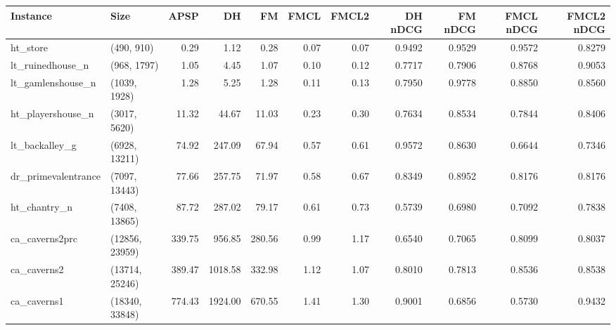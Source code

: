 \begin{tabular}{llrrrrrrrrr}
\toprule
           Instance &           Size &   APSP &      DH &     FM &  FMCL &  FMCL2 &  DH nDCG &  FM nDCG &  FMCL nDCG &  FMCL2 nDCG \\
\midrule
           ht\_store &     (490, 910) &   0.29 &    1.12 &   0.28 &  0.07 &   0.07 &   0.9492 &   0.9529 &     0.9572 &      0.8279 \\
   lt\_ruinedhouse\_n &    (968, 1797) &   1.05 &    4.45 &   1.07 &  0.10 &   0.12 &   0.7717 &   0.7906 &     0.8768 &      0.9053 \\
  lt\_gamlenshouse\_n &   (1039, 1928) &   1.28 &    5.25 &   1.28 &  0.11 &   0.13 &   0.7950 &   0.9778 &     0.8850 &      0.8560 \\
  ht\_playershouse\_n &   (3017, 5620) &  11.32 &   44.67 &  11.03 &  0.23 &   0.30 &   0.7634 &   0.8534 &     0.7844 &      0.8406 \\
     lt\_backalley\_g &  (6928, 13211) &  74.92 &  247.09 &  67.94 &  0.57 &   0.61 &   0.9572 &   0.8630 &     0.6644 &      0.7346 \\
dr\_primevalentrance &  (7097, 13443) &  77.66 &  257.75 &  71.97 &  0.58 &   0.67 &   0.8349 &   0.8952 &     0.8176 &      0.8176 \\
       ht\_chantry\_n &  (7408, 13865) &  87.72 &  287.02 &  79.17 &  0.61 &   0.73 &   0.5739 &   0.6980 &     0.7092 &      0.7838 \\
     ca\_caverns2prc & (12856, 23959) & 339.75 &  956.85 & 280.56 &  0.99 &   1.17 &   0.6540 &   0.7065 &     0.8099 &      0.8037 \\
        ca\_caverns2 & (13714, 25246) & 389.47 & 1018.58 & 332.98 &  1.12 &   1.07 &   0.8010 &   0.7813 &     0.8536 &      0.8538 \\
        ca\_caverns1 & (18340, 33848) & 774.43 & 1924.00 & 670.55 &  1.41 &   1.30 &   0.9001 &   0.6856 &     0.5730 &      0.9432 \\
\bottomrule
\end{tabular}
